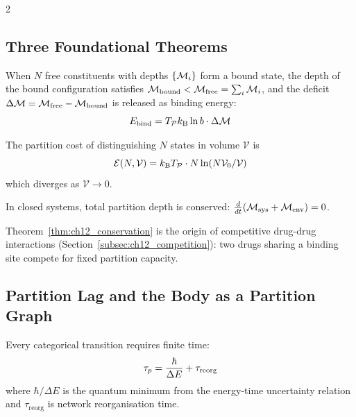 \begin{multicols}{2}
\subsection{Three Foundational Theorems}

\begin{theorem}[Composition]
\label{thm:ch12_composition}
When $N$ free constituents with depths $\{\mathcal{M}_i\}$ form a bound state, the depth of the bound configuration satisfies $\mathcal{M}_{\mathrm{bound}} < \mathcal{M}_{\mathrm{free}} = \sum_i\mathcal{M}_i$, and the deficit $\Delta\mathcal{M} = \mathcal{M}_{\mathrm{free}} - \mathcal{M}_{\mathrm{bound}}$ is released as binding energy:
\begin{equation}
E_{\mathrm{bind}} = T_{\mathcal{P}}k_{\mathrm{B}}\ln b\cdot\Delta\mathcal{M}
\label{eq:ch12_composition}
\end{equation}
\end{theorem}

\begin{theorem}[Compression]
\label{thm:ch12_compression}
The partition cost of distinguishing $N$ states in volume $\mathcal{V}$ is
\begin{equation}
\mathcal{E}(N,\mathcal{V}) = k_{\mathrm{B}}T_{\mathcal{P}}\cdot N\ln(N\mathcal{V}_0/\mathcal{V})
\label{eq:ch12_compression}
\end{equation}
which diverges as $\mathcal{V} \to 0$.
\end{theorem}

\begin{theorem}
\label{thm:ch12_conservation}
In closed systems, total partition depth is conserved: $\frac{d}{dt}(\mathcal{M}_{\mathrm{sys}} + \mathcal{M}_{\mathrm{env}}) = 0$.
\end{theorem}

Theorem~\ref{thm:ch12_conservation} is the origin of competitive drug-drug interactions (Section~\ref{subsec:ch12_competition}): two drugs sharing a binding site compete for fixed partition capacity.

\subsection{Partition Lag and the Body as a Partition Graph}

\begin{definition}
Every categorical transition requires finite time:
\begin{equation}
\tau_p = \frac{\hbar}{\Delta E} + \tau_{\mathrm{reorg}}
\label{eq:ch12_lag}
\end{equation}
where $\hbar/\Delta E$ is the quantum minimum from the energy-time uncertainty relation and $\tau_{\mathrm{reorg}}$ is network reorganisation time.
\end{definition}


\end{multicols}
